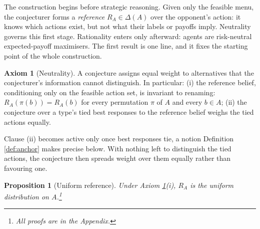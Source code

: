 \documentclass[12pt]{article}
\newtheorem{proposition}{Proposition}
\theoremstyle{definition}
\newtheorem{axiom}{Axiom}
\begin{document}

The construction begins before strategic reasoning. Given only the feasible menu, the conjecturer forms a \emph{reference} $R_A \in \Delta(A)$ over the opponent's action: it knows which actions exist, but not what their labels or payoffs imply. Neutrality governs this first stage. Rationality enters only afterward: agents are risk-neutral expected-payoff maximisers. The first result is one line, and it fixes the starting point of the whole construction.

\begin{axiom}[Neutrality]\label{ax:neu}
A conjecture assigns equal weight to alternatives that the conjecturer's information cannot distinguish. In particular: (i) the reference belief, conditioning only on the feasible action set, is invariant to renaming: $R_A(\pi(b)) = R_A(b)$ for every permutation $\pi$ of $A$ and every $b \in A$; (ii) the conjecture over a type's tied best responses to the reference belief weighs the tied actions equally.
\end{axiom}

Clause (ii) becomes active only once best responses tie, a notion Definition \ref{def:anchor} makes precise below. With nothing left to distinguish the tied actions, the conjecture then spreads weight over them equally rather than favouring one.

\begin{proposition}[Uniform reference]\label{prop:reference}
Under Axiom \ref{ax:neu}(i), $R_A$ is the uniform distribution on $A$.\footnote{All proofs are in the Appendix.}
\end{proposition}
\end{document}
